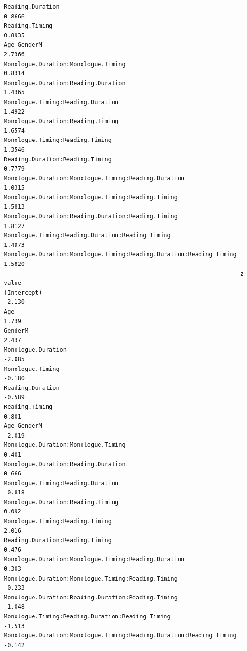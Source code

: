 \documentclass[
  english,
  doc,floatsintext]{apa6}
\begin{document}
\begin{verbatim}
Reading.Duration                                                        0.8666
Reading.Timing                                                          0.8935
Age:GenderM                                                             2.7366
Monologue.Duration:Monologue.Timing                                     0.8314
Monologue.Duration:Reading.Duration                                     1.4365
Monologue.Timing:Reading.Duration                                       1.4922
Monologue.Duration:Reading.Timing                                       1.6574
Monologue.Timing:Reading.Timing                                         1.3546
Reading.Duration:Reading.Timing                                         0.7779
Monologue.Duration:Monologue.Timing:Reading.Duration                    1.0315
Monologue.Duration:Monologue.Timing:Reading.Timing                      1.5813
Monologue.Duration:Reading.Duration:Reading.Timing                      1.8127
Monologue.Timing:Reading.Duration:Reading.Timing                        1.4973
Monologue.Duration:Monologue.Timing:Reading.Duration:Reading.Timing     1.5820
                                                                    z value
(Intercept)                                                          -2.130
Age                                                                   1.739
GenderM                                                               2.437
Monologue.Duration                                                   -2.085
Monologue.Timing                                                     -0.180
Reading.Duration                                                     -0.589
Reading.Timing                                                        0.801
Age:GenderM                                                          -2.019
Monologue.Duration:Monologue.Timing                                   0.401
Monologue.Duration:Reading.Duration                                   0.666
Monologue.Timing:Reading.Duration                                    -0.818
Monologue.Duration:Reading.Timing                                     0.092
Monologue.Timing:Reading.Timing                                       2.016
Reading.Duration:Reading.Timing                                       0.476
Monologue.Duration:Monologue.Timing:Reading.Duration                  0.303
Monologue.Duration:Monologue.Timing:Reading.Timing                   -0.233
Monologue.Duration:Reading.Duration:Reading.Timing                   -1.048
Monologue.Timing:Reading.Duration:Reading.Timing                     -1.513
Monologue.Duration:Monologue.Timing:Reading.Duration:Reading.Timing  -0.142

\end{verbatim}
\end{document}
